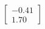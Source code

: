 \documentclass[preview]{standalone}
\begin{document}
\begin{align*}
\begin{bmatrix} -0.41 \\ 1.70 \end{bmatrix}
\end{align*}
\end{document}
